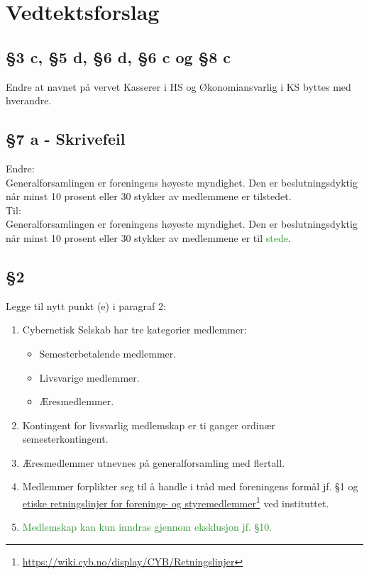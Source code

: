 \documentclass[10pt,norsk,a4paper,usenames,dvipsnames]{article}
\newcommand\fhref[2]{%
	\href{#1}{#2}\footnote{\url{#1}}%
}
\begin{document}
\newpage

\section{Vedtektsforslag}

    \subsection{§3 c, §5 d, §6 d, §6 c og §8 c}
        Endre at navnet på vervet Kasserer i HS og Økonomiansvarlig i KS byttes med hverandre.
        
    \subsection{§7 a - Skrivefeil}
        Endre:
        \\Generalforsamlingen er foreningens høyeste myndighet. Den er beslutningsdyktig når minst 10 prosent eller 30 stykker av medlemmene er tilstedet.
        \\Til:
        \\Generalforsamlingen er foreningens høyeste myndighet. Den er beslutningsdyktig når minst 10 prosent eller 30 stykker av medlemmene er til \textcolor{ForestGreen}{stede}.

    \subsection{§2}
    Legge til nytt punkt (e) i paragraf 2:
    
    \begin{enumerate}
    	\item{Cybernetisk Selskab har tre kategorier medlemmer:}
    	\begin{itemize}
    		\item{Semesterbetalende medlemmer.}
    		\item{Livsvarige medlemmer.}
    		\item{Æresmedlemmer.}
    	\end{itemize}
    	\item{Kontingent for livsvarlig medlemskap er ti ganger ordinær semesterkontingent.}
    	\item{Æresmedlemmer utnevnes på generalforsamling med  flertall.}
    	\item Medlemmer forplikter seg til å handle i tråd med foreningens formål jf. §1 og \fhref{https://wiki.cyb.no/display/CYB/Retningslinjer}{etiske retningslinjer for forenings- og styremedlemmer} ved instituttet.
    	\item \textcolor{ForestGreen}{Medlemskap kan kun inndras gjennom eksklusjon jf. §10.}
    \end{enumerate}
        
\end{document}
